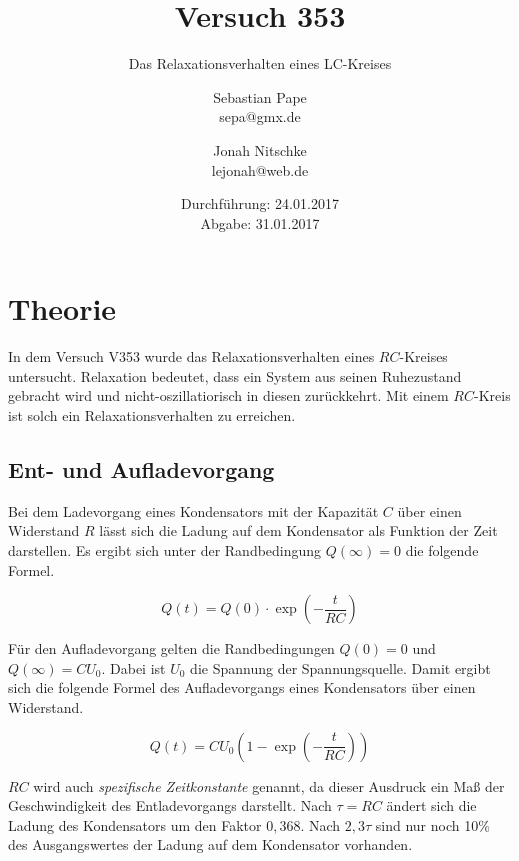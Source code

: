 

\title{Versuch 353}
\subtitle{Das Relaxationsverhalten eines LC-Kreises}
\author{Sebastian Pape\\
        sepa@gmx.de \and
        Jonah Nitschke\\
        lejonah@web.de}
\date{Durchführung: 24.01.2017\\
      Abgabe: 31.01.2017}


\maketitle
\setcounter{page}{1}

\section{Theorie}

In dem Versuch V353 wurde das Relaxationsverhalten eines $RC$-Kreises untersucht.
Relaxation bedeutet, dass ein System aus seinen Ruhezustand gebracht wird
und nicht-oszillatiorisch in diesen zurückkehrt.
Mit einem $RC$-Kreis ist solch ein Relaxationsverhalten zu erreichen.

\subsection{Ent- und Aufladevorgang}

Bei dem Ladevorgang eines Kondensators mit der Kapazität $C$ über einen Widerstand
$R$ lässt sich die Ladung auf dem Kondensator als Funktion der Zeit darstellen.
Es ergibt sich unter der Randbedingung $Q(\infty) = 0$ die folgende Formel.

\begin{equation}
  \label{eqn:Entladen}
  Q(t) = Q(0)\cdot \exp{(-\frac{t}{RC})}
\end{equation}

Für den Aufladevorgang gelten die Randbedingungen $Q(0) = 0$ und $Q(\infty) = CU_0$. Dabei ist $U_0$ die Spannung der Spannungsquelle. Damit ergibt sich
die folgende Formel des Aufladevorgangs eines Kondensators über einen Widerstand.

\begin{equation}
  \label{eqn:aufladen}
  Q(t) = CU_0(1 - \exp{(-\frac{t}{RC})})
\end{equation}

$RC$ wird auch \emph{spezifische Zeitkonstante} genannt, da dieser Ausdruck ein Maß
der Geschwindigkeit des Entladevorgangs darstellt.
Nach $\tau = RC$ ändert sich die Ladung des Kondensators um den Faktor $0,368$. Nach $2,3\tau$ sind nur noch 10\% des Ausgangswertes der Ladung auf dem
Kondensator vorhanden.

